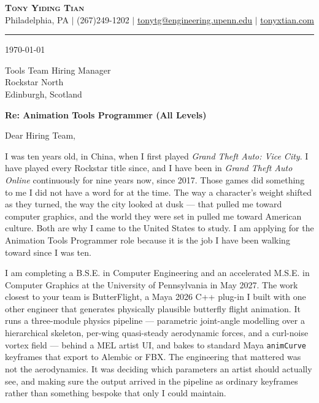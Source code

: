 \documentclass[letterpaper,11pt]{article}
\begin{document}
\begin{center}
    \textbf{\Huge \scshape Tony Yiding Tian} \\ \vspace{1pt}
    \small Philadelphia, PA $|$ (267)249-1202 $|$ \href{mailto:tonytg@engineering.upenn.edu}{\underline{tonytg@engineering.upenn.edu}} $|$
    \href{https://tonyxtian.com}{\underline{tonyxtian.com}}
\end{center}

\vspace{0.5em}
\hrule
\vspace{1.5em}

\today

\vspace{0.5em}

Tools Team Hiring Manager \\
Rockstar North \\
Edinburgh, Scotland

\vspace{1em}

\textbf{Re: Animation Tools Programmer (All Levels)}

\vspace{0.5em}

Dear Hiring Team,

I was ten years old, in China, when I first played \emph{Grand Theft Auto: Vice City}. I have played every Rockstar title since, and I have been in \emph{Grand Theft Auto Online} continuously for nine years now, since 2017. Those games did something to me I did not have a word for at the time. The way a character's weight shifted as they turned, the way the city looked at dusk --- that pulled me toward computer graphics, and the world they were set in pulled me toward American culture. Both are why I came to the United States to study. I am applying for the Animation Tools Programmer role because it is the job I have been walking toward since I was ten.

I am completing a B.S.E. in Computer Engineering and an accelerated M.S.E. in Computer Graphics at the University of Pennsylvania in May 2027. The work closest to your team is ButterFlight, a Maya 2026 C++ plug-in I built with one other engineer that generates physically plausible butterfly flight animation. It runs a three-module physics pipeline --- parametric joint-angle modelling over a hierarchical skeleton, per-wing quasi-steady aerodynamic forces, and a curl-noise vortex field --- behind a MEL artist UI, and bakes to standard Maya \texttt{animCurve} keyframes that export to Alembic or FBX. The engineering that mattered was not the aerodynamics. It was deciding which parameters an artist should actually see, and making sure the output arrived in the pipeline as ordinary keyframes rather than something bespoke that only I could maintain.
\end{document}

